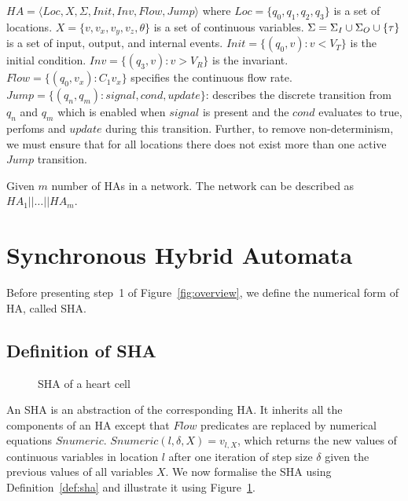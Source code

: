 \begin{definition}
	\label{def:ha}
	 $HA = \langle Loc, X, \Sigma, Init, Inv, Flow, Jump \rangle$ where
	$Loc=\{q_0,q_1,q_2,q_3\}$ is a set of locations.
	$X=\{v,v_x,v_y,v_z,\theta\}$ is a set of continuous variables.
	$\Sigma=\Sigma_I \cup \Sigma_O \cup \{\tau\}$ is a set of
	 input, output, and internal events.
	$Init=\{(q_0,v): v < V_T\}$ is the initial condition.
	$Inv=\{(q_3,v): v > V_R\}$ is the invariant.
	$Flow=\{(q_0,v_x): C_1 v_x\}$ specifies the continuous flow rate.
	$Jump=\{(q_n, q_m): signal, cond, update\}$: describes the discrete
	transition from $q_n$ and $q_m$ which is enabled when $signal$ is 
	present and the $cond$ evaluates to true, perfoms and $update$
	during this transition.
	Further, to remove non-determinism, we must ensure that
	for all locations there does not exist more than one 
	active $Jump$ transition.
\end{definition}

Given  $m$   number of \acp{HA} in a network.
The network can be described as $HA_1 || \dots || HA_m$.


\section{Synchronous Hybrid Automata}
\label{sec:SHA}
 
Before presenting step~1 of Figure~\ref{fig:overview},
we define the numerical form of \ac{HA}, 
called \acf{SHA}.

\subsection{Definition of \acf{SHA}}
\label{sec:defSHA}

\begin{figure}
	\centering
	
	\caption{\acf{SHA} of a heart cell \label{fig:heartCellSHA}}
\end{figure}

An \ac{SHA} is an  abstraction of the corresponding \ac{HA}. 
It inherits all the
components of an \ac{HA} except that $Flow$ predicates are replaced by numerical equations $Snumeric$.
$Snumeric(l,\delta,X)=v_{l,X}$, which returns the new values of
continuous variables in location $l$ after one iteration of step size $\delta$ given the previous values of all variables $X$.
We now formalise
the \ac{SHA} using Definition~\ref{def:sha} and illustrate it using Figure~\ref{fig:heartCellSHA}.



